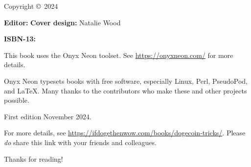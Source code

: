 \thispagestyle{empty}

\huge{\booktitle}
\newline
\large{\booksubtitle}
\newline
\newline
\normalsize

Copyright \copyright~2024 \bookauthor

\vfill
\textbf{Editor:} \bookauthor\newline
\textbf{Cover design:} Natalie Wood

\textbf{ISBN-13:} \bookisbnthirteen

This book uses the Onyx Neon toolset. See \url{https://onyxneon.com/} for more
details.

Onyx Neon typesets books with free software, especially Linux, Perl, PseudoPod,
and \LaTeX. Many thanks to the contributors who make these and other projects
possible.

First edition November 2024.

For more details, see \url{https://ifdogethenwow.com/books/dogecoin-tricks/}.
Please \emph{do} share this link with your friends and colleagues.

Thanks for reading!

